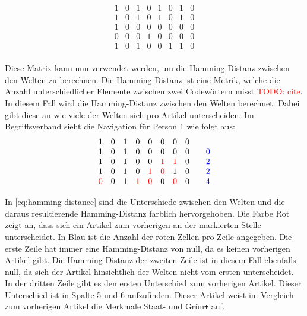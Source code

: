 \setcounter{equation}{0}
\begin{equation}
    \begin{matrix}
        1 & 0 & 1 & 0 & 1 & 0 & 1 & 0 \\
        1 & 0 & 1 & 0 & 1 & 0 & 1 & 0 \\
        1 & 0 & 0 & 0 & 0 & 0 & 0 & 0 \\
        0 & 0 & 0 & 1 & 0 & 0 & 0 & 0 \\
        1 & 0 & 1 & 0 & 0 & 1 & 1 & 0 \\
    \end{matrix}
\end{equation}

Diese Matrix kann nun verwendet werden, um die Hamming-Distanz zwischen den Welten zu berechnen.
Die Hamming-Distanz ist eine Metrik, welche die Anzahl unterschiedlicher Elemente zwischen zwei Codewörtern misst \textcolor{red}{TODO: cite}.
In diesem Fall wird die Hamming-Distanz zwischen den Welten berechnet.
Dabei gibt diese an wie viele der Welten sich pro Artikel unterscheiden.
Im Begriffsverband sieht die Navigation für Person 1 wie folgt aus:
\begin{equation}
    \begin{array}{ccccccccc}
        1                  & 0 & 1 & 0                  & 0                  & 0                  & 0                  & 0 &                                              \\
        1                  & 0 & 1 & 0                  & 0                  & 0                  & 0                  & 0 & \multicolumn{1}{r}{\quad\textcolor{blue}{0}} \\
        1                  & 0 & 1 & 0                  & 0                  & \textcolor{red}{1} & \textcolor{red}{1} & 0 & \multicolumn{1}{r}{\quad\textcolor{blue}{2}} \\
        1                  & 0 & 1 & 0                  & \textcolor{red}{1} & \textcolor{red}{0} & 1                  & 0 & \multicolumn{1}{r}{\quad\textcolor{blue}{2}} \\
        \textcolor{red}{0} & 0 & 1 & \textcolor{red}{1} & \textcolor{red}{0} & 0                  & \textcolor{red}{0} & 0 & \multicolumn{1}{r}{\quad\textcolor{blue}{4}} \\
    \end{array}
    \label{eq:hamming-distance}
\end{equation}

In \autoref{eq:hamming-distance} sind die Unterschiede zwischen den Welten und die daraus resultierende Hamming-Distanz farblich hervorgehoben.
Die Farbe Rot zeigt an, dass sich ein Artikel zum vorherigen an der markierten Stelle unterscheidet.
In Blau ist die Anzahl der roten Zellen pro Zeile angegeben.
Die erste Zeile hat immer eine Hamming-Distanz von null, da es keinen vorherigen Artikel gibt.
Die Hamming-Distanz der zweiten Zeile ist in diesem Fall ebenfalls null, da sich der Artikel hinsichtlich der Welten nicht vom ersten unterscheidet.
In der dritten Zeile gibt es den ersten Unterschied zum vorherigen Artikel.
Dieser Unterschied ist in Spalte 5 und 6 aufzufinden.
Dieser Artikel weist im Vergleich zum vorherigen Artikel die Merkmale Staat- und Grün\texttt{+} auf.

